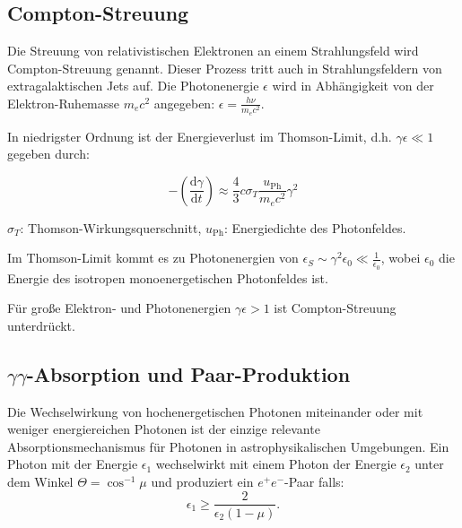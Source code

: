 \subsection{Compton-Streuung}
Die Streuung von relativistischen Elektronen an einem Strahlungsfeld wird Compton-Streuung genannt.
Dieser Prozess tritt auch in Strahlungsfeldern von extragalaktischen Jets auf.
Die Photonenergie $\epsilon$ wird in Abhängigkeit von der Elektron-Ruhemasse $m_e c^2$ angegeben: $\epsilon= \frac{h\nu}{m_e c^2}$. \cite{RelativisticJets}
 
In niedrigster Ordnung ist der Energieverlust im Thomson-Limit, d.h. $\gamma \epsilon \ll 1$ gegeben durch:

\begin{equation}
-\left(\frac{\mathrm{d}\gamma}{\mathrm{d}t} \right) \approx \frac{4}{3} c \sigma_T \frac{u_{\text{Ph}}}{m_e c^2} \gamma^2
\end{equation}

\begin{center}
 \begin{small}
  $\sigma_T$: Thomson-Wirkungsquerschnitt, $u_{\text{Ph}}$: Energiedichte des Photonfeldes.
 \end{small}
\end{center}

Im Thomson-Limit kommt es zu Photonenergien von $\epsilon_S \sim \gamma^2 \epsilon_0 \ll \frac{1}{\epsilon_0} $, wobei $\epsilon_0$ die Energie des isotropen monoenergetischen Photonfeldes ist.\cite{RelativisticJets}

Für große Elektron- und Photonenergien $\gamma \epsilon > 1$ ist Compton-Streuung unterdrückt.\cite{RelativisticJets}


\subsection{$\gamma\gamma$-Absorption und Paar-Produktion}
Die Wechselwirkung von hochenergetischen Photonen miteinander oder mit weniger energiereichen Photonen ist der einzige relevante Absorptionsmechanismus für Photonen in astrophysikalischen Umgebungen.
Ein Photon mit der Energie $\epsilon_1$ wechselwirkt mit einem Photon der Energie $\epsilon_2$ unter dem Winkel $\Theta=\cos^{-1}\mu$ und produziert ein $e^+e^-$-Paar falls:
\begin{equation}
 \epsilon_1 \geq \frac{2}{\epsilon_2 (1-\mu)}.
\end{equation}

